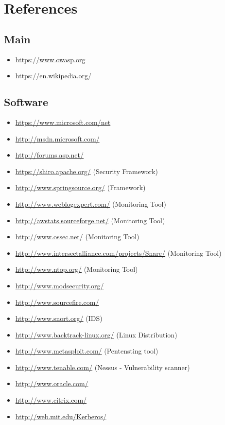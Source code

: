 \section*{References}

\subsection*{Main}
\begin{itemize}
\item \url{https://www.owasp.org}
\item \url{https://en.wikipedia.org/}

\end{itemize}

\subsection*{Software}
\begin{itemize}
\item \url{https://www.microsoft.com/net}
\item \url{http://msdn.microsoft.com/}
\item \url{http://forums.asp.net/}

\item \url{https://shiro.apache.org/} (Security Framework)
\item \url{http://www.springsource.org/} (Framework)

\item \url{http://www.weblogexpert.com/} (Monitoring Tool)
\item \url{http://awstats.sourceforge.net/} (Monitoring Tool)
\item \url{http://www.ossec.net/} (Monitoring Tool)
\item \url{http://www.intersectalliance.com/projects/Snare/} (Monitoring Tool)
\item \url{http://www.ntop.org/} (Monitoring Tool)

\item \url{http://www.modsecurity.org/}
\item \url{http://www.sourcefire.com/}
\item \url{http://www.snort.org/} (IDS)
\item \url{http://www.backtrack-linux.org/} (Linux Distribution)
\item \url{http://www.metasploit.com/} (Pentensting tool)
\item \url{http://www.tenable.com/} (Nessus - Vulnerability scanner)
\item \url{http://www.oracle.com/}
\item \url{http://www.citrix.com/}

\item \url{http://web.mit.edu/Kerberos/}


\end{itemize}
